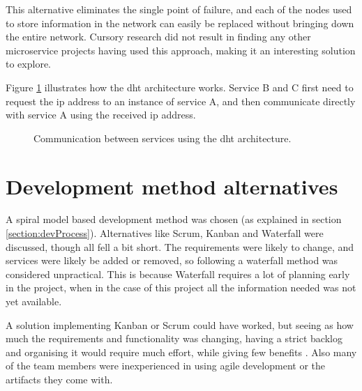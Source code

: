 This alternative eliminates the single point of failure, and each of the nodes used to store information in the network can easily be replaced without bringing down the entire network.
Cursory research did not result in finding any other microservice projects having used this approach, making it an interesting solution to explore.

Figure \ref{fig:alternativeDHT} illustrates how the \acrshort{dht} architecture works. Service B and C first need to request the \acrshort{ip} address to an instance of service A, and then communicate directly with service A using the received \acrshort{ip} address.

\begin{figure}[H]
    \centering
    \scalebox{1.1}{}
    \caption{Communication between services using the \acrshort{dht} architecture.}
    \label{fig:alternativeDHT}
\end{figure}


\section{Development method alternatives}
A spiral model based development method was chosen (as explained in section \ref{section:devProcess}). Alternatives like Scrum, Kanban and Waterfall were discussed, though all fell a bit short. The requirements were likely to change, and services were likely be added or removed, so following a waterfall method was considered unpractical. This is because Waterfall requires a lot of planning early in the project, when in the case of this project all the information needed was not yet available.

A solution implementing Kanban or Scrum could have worked, but seeing as how much the requirements and functionality was changing, having a strict backlog and organising it would require much effort, while giving few benefits \citep{scrumVideo}. Also many of the team members were inexperienced in using agile development or the artifacts they come with.
